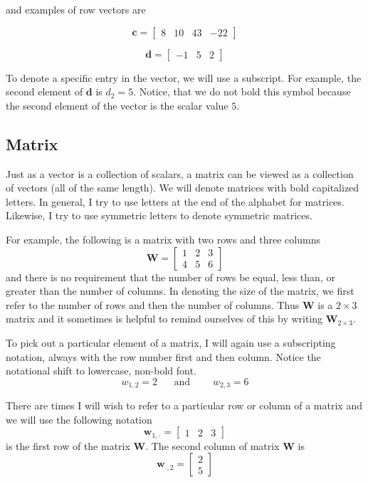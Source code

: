 \documentclass[]{book}
\theoremstyle{definition}
\theoremstyle{definition}
\theoremstyle{remark}
\begin{document}
and examples of row vectors are

\[
\boldsymbol{c}=\left[\begin{array}{cccc}
8 & 10 & 43 & -22\end{array}\right]
\]

\[
\boldsymbol{d}=\left[\begin{array}{ccc}
-1 & 5 & 2\end{array}\right]
\]

To denote a specific entry in the vector, we will use a subscript. For
example, the second element of \(\boldsymbol{d}\) is \(d_{2}=5\).
Notice, that we do not bold this symbol because the second element of
the vector is the scalar value \(5\).

\subsection{Matrix}\label{matrix}

Just as a vector is a collection of scalars, a matrix can be viewed as a
collection of vectors (all of the same length). We will denote matrices
with bold capitalized letters. In general, I try to use letters at the
end of the alphabet for matrices. Likewise, I try to use symmetric
letters to denote symmetric matrices.

For example, the following is a matrix with two rows and three columns
\[
\boldsymbol{W}=\left[\begin{array}{ccc}
1 & 2 & 3\\
4 & 5 & 6
\end{array}\right]
\] and there is no requirement that the number of rows be equal, less
than, or greater than the number of columns. In denoting the size of the
matrix, we first refer to the number of rows and then the number of
columns. Thus \(\boldsymbol{W}\) is a \(2\times3\) matrix and it
sometimes is helpful to remind ourselves of this by writing
\(\boldsymbol{W}_{2\times3}\).

To pick out a particular element of a matrix, I will again use a
subscripting notation, always with the row number first and then column.
Notice the notational shift to lowercase, non-bold font. \[
w_{1,2}=2\;\;\;\;\;\;\textrm{and }\;\;\;\;\;\;\;w_{2,3}=6
\]

There are times I will wish to refer to a particular row or column of a
matrix and we will use the following notation \[
\boldsymbol{w}_{1,\cdot}=\left[\begin{array}{ccc}
1 & 2 & 3\end{array}\right]
\] is the first row of the matrix \(\boldsymbol{W}\). The second column
of matrix \(\boldsymbol{W}\) is \[
\boldsymbol{w}_{\cdot,2}=\left[\begin{array}{c}
2\\
5
\end{array}\right]
\]
\end{document}

